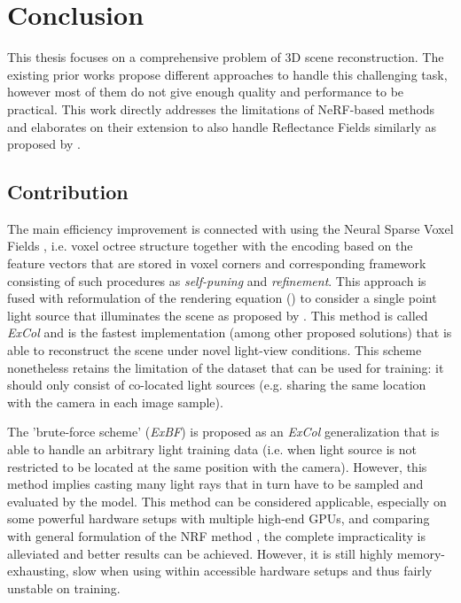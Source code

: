 \chapter{Conclusion}
\label{chap:conclusion}

This thesis focuses on a comprehensive problem of 3D scene reconstruction.
The existing prior works propose different approaches to handle this challenging task,
however most of them do not give enough quality and performance to be practical.
This work directly addresses the limitations of NeRF-based \cite{mildenhall2020nerf} methods
and elaborates on their extension to also handle Reflectance Fields similarly as proposed by \cite{bi2020neural}.


\section{Contribution}

The main efficiency improvement is connected with using the Neural Sparse Voxel Fields \cite{liu2021neural},
i.e. voxel octree structure together with the encoding
based on the feature vectors that are stored in voxel corners
and corresponding framework consisting of such procedures as \textit{self-puning} and \textit{refinement}.
This approach is fused with reformulation of the rendering equation ()
to consider a single point light source that illuminates the scene as proposed by \cite{bi2020neural}.
This method is called \textit{ExCol} and is the fastest implementation
(among other proposed solutions) that is able to reconstruct the scene under novel light-view conditions.
This scheme nonetheless retains the limitation of the dataset that can be used for training:
it should only consist of co-located light sources
(e.g. sharing the same location with the camera in each image sample).

The 'brute-force scheme' (\textit{ExBF}) is proposed as an \textit{ExCol} generalization
that is able to handle an arbitrary light training data
(i.e. when light source is not restricted to be located at the same position with the camera).
However, this method implies casting many light rays that in turn have to be sampled and evaluated by the model.
This method can be considered applicable, especially on some powerful hardware setups with multiple high-end GPUs,
and comparing with general formulation of the NRF method \cite{bi2020neural},
the complete impracticality is alleviated and better results can be achieved.
However, it is still highly memory-exhausting, slow when using within accessible hardware setups and thus fairly unstable on training.

